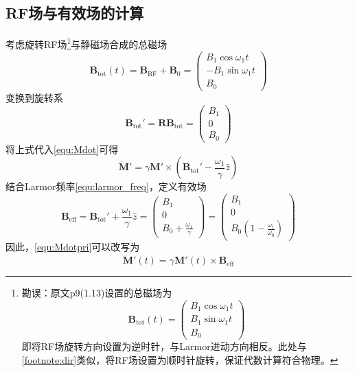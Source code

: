 \documentclass[12pt]{article}
\begin{document}
\subsection{RF场与有效场的计算}\label{chap:B_eff}
考虑旋转RF场\footnote{勘误：原文p9(1.13)设置的总磁场为
\begin{equation}
    \bm{B}_\mathrm{tot}(t)=\begin{pmatrix} B_1\cos\omega_1t \\ B_1\sin\omega_1t \\ B_0 \end{pmatrix}
\end{equation}
即将RF场旋转方向设置为逆时针，与Larmor进动方向相反。此处与\autoref{footnote:dir}类似，将RF场设置为顺时针旋转，保证代数计算符合物理。}与静磁场合成的总磁场
\begin{equation}
    \bm{B}_\mathrm{tot}(t)=\bm{B}_\mathrm{RF}+\bm{B}_0=\begin{pmatrix} B_1\cos\omega_1t \\ -B_1\sin\omega_1t \\ B_0 \end{pmatrix} \label{equ:B_tot}
\end{equation}
变换到旋转系
\begin{equation}
    \bm{B}_\mathrm{tot}'=\mathbf{R}\bm{B}_\mathrm{tot}=\begin{pmatrix} B_1 \\ 0 \\ B_0 \end{pmatrix}
\end{equation}
将上式代入\autoref{equ:Mdot}可得
\begin{equation}
    \dot{\bm{M}}'=\gamma\bm{M}'\times\left(\bm{B}_\mathrm{tot}'-\frac{\omega_1}{\gamma}\hat{z}\right)
    \label{equ:Mdotpri}
\end{equation}
结合Larmor频率\autoref{equ:larmor_freq}，定义有效场
\begin{equation}
    \bm{B}_\mathrm{eff}=\bm{B}_\mathrm{tot}'+\frac{\omega_1}{\gamma}\hat{z}=\begin{pmatrix} B_1 \\ 0 \\ B_0+\frac{\omega_1}{\gamma} \end{pmatrix}=\begin{pmatrix} B_1 \\ 0 \\ B_0\left(1-\frac{\omega_1}{\omega_0}\right) \end{pmatrix}
\end{equation}
因此，\autoref{equ:Mdotpri}可以改写为
\begin{equation}
    \boxed{\dot{\bm{M}}'(t)=\gamma\bm{M}'(t)\times\bm{B}_\mathrm{eff}}
    \label{equ:bloch_stat}
\end{equation}
\end{document}
